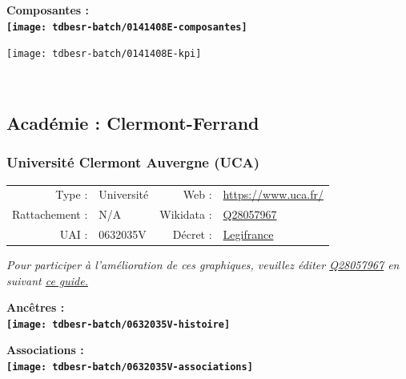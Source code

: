 \documentclass[12pt,french,]{article}
\begin{document}
\hrulefill

\begin{center} \bf Composantes : \\  
\texttt{[image: tdbesr-batch/0141408E-composantes]} \end{center}

\begin{center}\texttt{[image: tdbesr-batch/0141408E-kpi]} \end{center}\checkoddpage

\ifoddpage \fi ~\newpage  

\hypertarget{acaduxe9mie-clermont-ferrand}{%
\subsection{Académie :
Clermont-Ferrand}\label{acaduxe9mie-clermont-ferrand}}

\hypertarget{universituxe9-clermont-auvergne-uca}{%
\subsubsection{Université Clermont Auvergne
(UCA)}\label{universituxe9-clermont-auvergne-uca}}

\begin{tabular*}{\textwidth}{rp{5cm}rl}  
\hline  
Type : & Université & Web : &\href{https://www.uca.fr/}{https://www.uca.fr/} \\  
Rattachement : & N/A & Wikidata : & \href{https://www.wikidata.org/entity/Q28057967}{Q28057967} \\  
UAI : & 0632035V & Décret : & \href{https://www.legifrance.gouv.fr/affichTexte.do?cidTexte=JORFTEXT000033119145&categorieLien=id}{Legifrance} \\  
\hline  
\end{tabular*}

\textit{\scriptsize Pour participer à l'amélioration de ces graphiques, veuillez éditer  \href{https://www.wikidata.org/entity/Q28057967}{Q28057967}  en suivant \href{https://github.com/cpesr/wikidataESR/blob/master/Rmd/wikidataESR.md}{ce guide.}}

\vspace{1cm}  
\begin{minipage}[b]{0.50\textwidth}\begin{center} \bf Ancêtres : \\  
\texttt{[image: tdbesr-batch/0632035V-histoire]} \end{center}\end{minipage}\begin{minipage}[b]{0.50\textwidth}\begin{center} \bf Associations : \\  
\texttt{[image: tdbesr-batch/0632035V-associations]} \end{center}\end{minipage}
\end{document}
